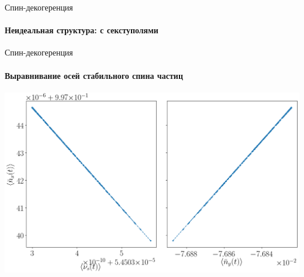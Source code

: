 \documentclass[14pt]{beamer}
\begin{document}
\begin{frame}{Спин-декогеренция}
	\framesubtitle{Неидеальная структура: с секступолями}
\end{frame}
\begin{frame}{Спин-декогеренция}\centering
	\framesubtitle{Выравнивание осей стабильного спина частиц}
	\includegraphics[width=.9\linewidth]{decoh_sim/mean_n_bar_vs_spin_tune}
\end{frame}
\end{document}
